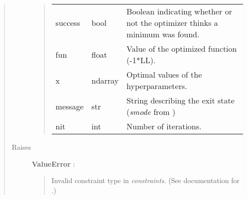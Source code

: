 \documentclass[letterpaper,10pt,english]{sphinxmanual}
\begin{document}
\begin{fulllineitems}
\begin{quote}
\begin{description}
\begin{quote}
\begin{tabulary}{\linewidth}{|L|L|L|}
success
 & 
bool
 & 
Boolean indicating whether or not the optimizer thinks a minimum was found.
\\

fun
 & 
float
 & 
Value of the optimized function (-1*LL).
\\

x
 & 
ndarray
 & 
Optimal values of the hyperparameters.
\\

message
 & 
str
 & 
String describing the exit state (\emph{smode} from )
\\

nit
 & 
int
 & 
Number of iterations.
\\
\hline\end{tabulary}

\end{quote}

\item[{Raises}] \leavevmode
\textbf{ValueError} :
\begin{quote}

Invalid constraint type in \emph{constraints}. (See documentation for .)
\end{quote}

\end{description}\end{quote}

\end{fulllineitems}

\end{document}
